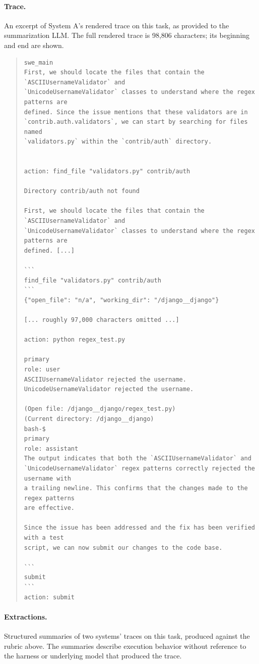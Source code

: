 \documentclass{article}
\begin{document}
\paragraph{Trace.} An excerpt of System A's rendered trace on this task, as provided to the summarization LLM.
The full rendered trace is 98{,}806 characters; its beginning and end are shown.
\begin{quote}\scriptsize\begin{verbatim}
swe_main
First, we should locate the files that contain the `ASCIIUsernameValidator` and
`UnicodeUsernameValidator` classes to understand where the regex patterns are
defined. Since the issue mentions that these validators are in
`contrib.auth.validators`, we can start by searching for files named
`validators.py` within the `contrib/auth` directory.


action: find_file "validators.py" contrib/auth

Directory contrib/auth not found

First, we should locate the files that contain the `ASCIIUsernameValidator` and
`UnicodeUsernameValidator` classes to understand where the regex patterns are
defined. [...]

```
find_file "validators.py" contrib/auth
```
{"open_file": "n/a", "working_dir": "/django__django"}

[... roughly 97,000 characters omitted ...]

action: python regex_test.py

primary
role: user
ASCIIUsernameValidator rejected the username.
UnicodeUsernameValidator rejected the username.

(Open file: /django__django/regex_test.py)
(Current directory: /django__django)
bash-$
primary
role: assistant
The output indicates that both the `ASCIIUsernameValidator` and
`UnicodeUsernameValidator` regex patterns correctly rejected the username with
a trailing newline. This confirms that the changes made to the regex patterns
are effective.

Since the issue has been addressed and the fix has been verified with a test
script, we can now submit our changes to the code base.

```
submit
```
action: submit
\end{verbatim}\end{quote}

\paragraph{Extractions.} Structured summaries of two systems' traces on this task, produced against the rubric above. The summaries describe execution behavior without reference to the harness or underlying model that produced the trace.
\end{document}
